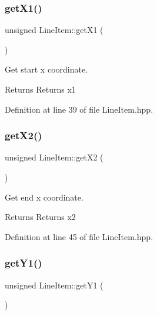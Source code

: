 \subsubsection{\texorpdfstring{get\+X1()}{getX1()}}
{\footnotesize\ttfamily unsigned Line\+Item\+::get\+X1 (\begin{DoxyParamCaption}{ }\end{DoxyParamCaption})\hspace{0.3cm}{\ttfamily [inline]}}



Get start x coordinate. 

\begin{DoxyReturn}{Returns}
Returns x1 
\end{DoxyReturn}


Definition at line 39 of file Line\+Item.\+hpp.

\mbox{\label{classLineItem_addce0ef5af72c233e2c7bf019c7a693d}} 
\subsubsection{\texorpdfstring{get\+X2()}{getX2()}}
{\footnotesize\ttfamily unsigned Line\+Item\+::get\+X2 (\begin{DoxyParamCaption}{ }\end{DoxyParamCaption})\hspace{0.3cm}{\ttfamily [inline]}}



Get end x coordinate. 

\begin{DoxyReturn}{Returns}
Returns x2 
\end{DoxyReturn}


Definition at line 45 of file Line\+Item.\+hpp.

\mbox{\label{classLineItem_abbdf5be2637561802ea22385c7c11df5}} 
\subsubsection{\texorpdfstring{get\+Y1()}{getY1()}}
{\footnotesize\ttfamily unsigned Line\+Item\+::get\+Y1 (\begin{DoxyParamCaption}{ }\end{DoxyParamCaption})\hspace{0.3cm}{\ttfamily [inline]}}



